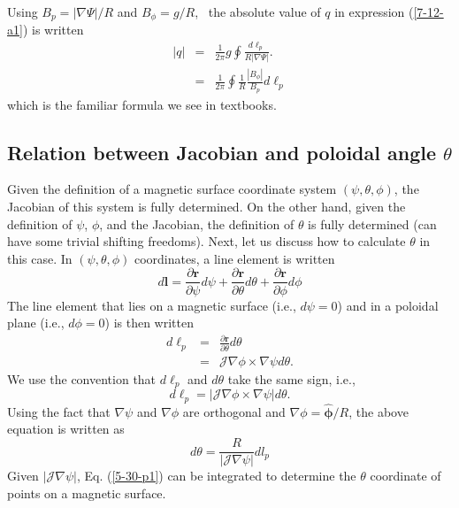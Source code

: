 \documentclass{article}
\newcommand{\tmmathbf}[1]{\ensuremath{\boldsymbol{#1}}}
\begin{document}
Using $B_p = | \nabla \Psi | / R$ and $B_{\phi} = g / R$, \ the absolute value
of $q$ in expression (\ref{7-12-a1}) is written
\begin{eqnarray}
  |q| & = & \frac{1}{2 \pi} g \oint \frac{d \ell_p}{R | \nabla \Psi |} . \\
  & = & \frac{1}{2 \pi} \oint \frac{1}{R}  \frac{|B_{\phi} |}{B_p} d \ell_p 
\end{eqnarray}
which is the familiar formula we see in textbooks.

\subsection{\label{3-13-p7}Relation between Jacobian and poloidal angle
$\theta$}

Given the definition of a magnetic surface coordinate system $(\psi, \theta,
\phi)$, the Jacobian of this system is fully determined. On the other hand,
given the definition of $\psi$, $\phi$, and the Jacobian, the definition of
$\theta$ is fully determined (can have some trivial shifting freedoms). Next,
let us discuss how to calculate $\theta$ in this case. In $(\psi, \theta,
\phi)$ coordinates, a line element is written
\begin{equation}
  \label{17-11-6-p1} d\mathbf{l}= \frac{\partial \mathbf{r}}{\partial \psi} d
  \psi + \frac{\partial \mathbf{r}}{\partial \theta} d \theta + \frac{\partial
  \mathbf{r}}{\partial \phi} d \phi
\end{equation}
The line element that lies on a magnetic surface (i.e., $d \psi = 0$) and in a
poloidal plane (i.e., $d \phi = 0$) is then written
\begin{eqnarray}
  d\tmmathbf{\ell}_p & = & \frac{\partial \mathbf{r}}{\partial \theta} d
  \theta \nonumber\\
  & = & \mathcal{J} \nabla \phi \times \nabla \psi d \theta . 
\end{eqnarray}
We use the convention that $d \ell_p$ and $d \theta$ take the same sign, i.e.,
\begin{equation}
  d \ell_p = | \mathcal{J} \nabla \phi \times \nabla \psi | d \theta .
\end{equation}
Using the fact that $\nabla \psi$ and $\nabla \phi$ are orthogonal and $\nabla
\phi = \hat{\tmmathbf{\phi}} / R$, the above equation is written as
\begin{equation}
  \label{5-30-p1} d \theta = \frac{R}{|\mathcal{J} \nabla \psi |} d l_p
\end{equation}
Given $|\mathcal{J} \nabla \psi |$, Eq. (\ref{5-30-p1}) can be integrated to
determine the $\theta$ coordinate of points on a magnetic surface.
\end{document}
